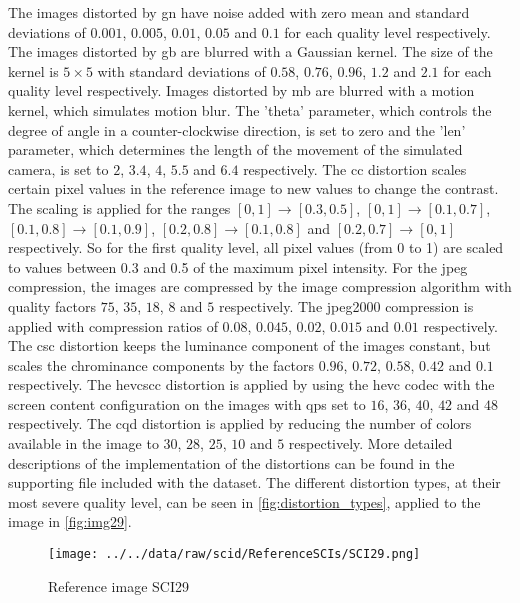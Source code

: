 The images distorted by \gls{gn} have noise added with zero mean and standard deviations of $0.001$, $0.005$, $0.01$, $0.05$ and $0.1$ for each quality level respectively.
The images distorted by \gls{gb} are blurred with a Gaussian kernel.
The size of the kernel is $5\times5$ with standard deviations of $0.58$, $0.76$, $0.96$, $1.2$ and $2.1$ for each quality level respectively.
Images distorted by \gls{mb} are blurred with a motion kernel, which simulates motion blur.
The 'theta' parameter, which controls the degree of angle in a counter-clockwise direction, is set to zero and the 'len' parameter, which determines the length of the movement of the simulated camera, is set to $2$, $3.4$, $4$, $5.5$ and $6.4$ respectively.
The \gls{cc} distortion scales certain pixel values in the reference image to new values to change the contrast.
The scaling is applied for the ranges $[0,1] \rightarrow [0.3,0.5]$, $[0,1] \rightarrow [0.1,0.7]$, $[0.1,0.8] \rightarrow [0.1,0.9]$, $[0.2,0.8] \rightarrow [0.1,0.8]$ and $[0.2,0.7] \rightarrow [0,1]$ respectively.
So for the first quality level, all pixel values (from 0 to 1) are scaled to values between 0.3 and 0.5 of the maximum pixel intensity.
For the \gls{jpeg} compression, the images are compressed by the image compression algorithm with quality factors $75$, $35$, $18$, $8$ and $5$ respectively.
The \gls{jpeg2000} compression is applied with compression ratios of $0.08$, $0.045$, $0.02$, $0.015$ and $0.01$ respectively.
The \gls{csc} distortion keeps the luminance component of the images constant, but scales the chrominance components by the factors $0.96$, $0.72$, $0.58$, $0.42$ and $0.1$ respectively.
The \gls{hevcscc} distortion is applied by using the \gls{hevc} codec with the screen content configuration on the images with \glspl{qp} set to $16$, $36$, $40$, $42$ and $48$ respectively.
The \gls{cqd} distortion is applied by reducing the number of colors available in the image to $30$, $28$, $25$, $10$ and $5$ respectively.
More detailed descriptions of the implementation of the distortions can be found in the supporting file included with the dataset.
The different distortion types, at their most severe quality level, can be seen in \autoref{fig:distortion_types}, applied to the image in \autoref{fig:img29}.

\begin{figure}[h!]
    \centering
    \texttt{[image: ../../data/raw/scid/ReferenceSCIs/SCI29.png]}
    \caption{Reference image SCI29}
    \label{fig:img29}
\end{figure}

